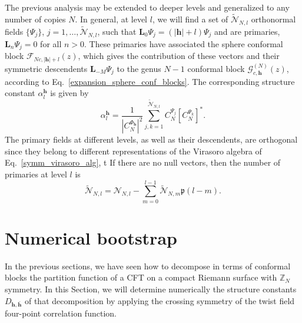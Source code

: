 \documentclass[a4paper,11pt]{article}
\begin{document}
The previous analysis may be extended to deeper levels and generalized to
any number of copies $N$. In general, at level $l$, we will find a set of 
$\tilde{\mathcal{N}}_{N,l}$ orthonormal fields $\{\Psi_j\}$, $j=1,\dots, \tilde{\mathcal{N}}_{N,l}$,
such that $\boldsymbol{L}_0\Psi_j=(|\boldsymbol{h}|+l)\Psi_j$ and are primaries,
$\boldsymbol{L}_n\Psi_j=0$ for all $n>0$. These primaries have associated the 
sphere conformal block $\mathcal{F}_{Nc, |\boldsymbol{h}|+l}(z)$, which gives the 
contribution of these vectors and their symmetric descendents $\boldsymbol{L}_{-M}\Psi_j$
to the genus $N-1$ conformal block $\mathcal{G}_{c, \boldsymbol{h}}^{(N)}(z)$, 
according to Eq.~\eqref{expansion_sphere_conf_blocks}. The corresponding structure constant $\alpha_l^{\boldsymbol{h}}$
is given by
\begin{equation}
 \alpha_l^{\boldsymbol{h}}=\frac{1}{|C_N^{\Phi_{\boldsymbol{h}}}|^2}\sum_{j, k=1}^{\tilde{\mathcal{N}}_{N,l}}
 C_N^{\Psi_{j}}\left[C_N^{\Psi_{k}}\right]^*.
\end{equation}
The primary fields at 
different levels, as well as their descendents, are orthogonal
since they belong to different representations of the Virasoro algebra of Eq.~\eqref{symm_virasoro_alg}, t
If there are no null vectors, then the number of primaries at level $l$ is
\begin{equation}
 \tilde{\mathcal{N}}_{N, l}=\mathcal{N}_{N, l}
 -\sum_{m=0}^{l-1}\tilde{\mathcal{N}}_{N, m}\mathfrak{p}(l-m).
\end{equation}
\section{Numerical bootstrap}\label{sec:num_bootstrap}
In the previous sections, we have seen how to decompose in terms of conformal blocks 
the partition function of a CFT on a compact Riemann surface with $\mathbb{Z}_N$ symmetry. 
In this Section, we will determine numerically the structure constants $D_{\boldsymbol{h}, \boldsymbol{\bar{h}}}$
of that decomposition by applying the crossing symmetry of the twist field four-point 
correlation function.
\end{document}
